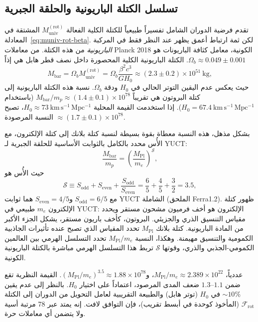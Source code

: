 \documentclass[12pt,a4paper]{article}
\newcommand{\Sodd}{S_{\mathrm{odd}}}
\newcommand{\Seven}{S_{\mathrm{even}}}
\begin{document}
	\subsection{تسلسل الكتلة الباريونية والحلقة الجبرية}
	\label{subsec:baryon-hierarchy}
	
	تقدم فرضية الدوران الشامل تفسيراً طبيعياً للكتلة الكلية الفعالة \(M_{\mathrm{univ}}^{\mathrm{(rot)}}\) المشتقة في المعادلة~\eqref{eq:muniv-rot-beta}. لكن ثمة ارتباط أعمق يظهر عند النظر فقط في المركبة \emph{الباريونية} من هذه الكتلة. من معاملات Planck 2018 الكونية، معامل كثافة الباريونات هو \(\Omega_b \approx 0.049 \pm 0.001\). الكتلة الباريونية الكلية المحصورة داخل نصف قطر هابل هي إذاً
	\begin{equation}
		M_{\mathrm{bar}} = \Omega_b M_{\mathrm{univ}}^{\mathrm{(rot)}} = \Omega_b \frac{\beta^2 c^3}{G H_0} \approx (2.3 \pm 0.2) \times 10^{51}\ \mathrm{kg},
	\end{equation}
	حيث يعكس عدم اليقين التوتر الحالي في \(H_0\) ودقة \(\Omega_b\). نسبة هذه الكتلة الباريونية إلى كتلة البروتون هي تقريباً \(M_{\mathrm{bar}}/m_p \approx (1.4 \pm 0.1) \times 10^{78}\) (باستخدام \(H_0 = 67.4\ \mathrm{km\,s^{-1}\,Mpc^{-1}}\)). إذا استخدمت القيمة المحلية \(H_0 \approx 73\ \mathrm{km\,s^{-1}\,Mpc^{-1}}\)، تصبح النسبة المرصودة \(\approx (1.7 \pm 0.1) \times 10^{78}\).
	
	بشكل مذهل، هذه النسبة معطاة بقوة بسيطة لنسبة كتلة بلانك إلى كتلة الإلكترون، مع الأُس محدد بالكامل بالثوابت الأساسية للحلقة الجبرية لـ YUCT:
	\begin{equation}
		\boxed{ \frac{M_{\mathrm{bar}}}{m_p} = \left( \frac{M_{\mathrm{Pl}}}{m_e} \right)^{\mathcal{S}} },
		\label{eq:baryon-hierarchy}
	\end{equation}
	حيث الأُس هو
	\begin{equation}
		\mathcal{S} \equiv \Sodd + \Seven + \frac{\Sodd}{\Seven} = \frac{6}{5} + \frac{4}{5} + \frac{3}{2} = 3.5,
	\end{equation}
	مع \(\Sodd = 6/5\) و\(\Seven = 4/5\) هما ثوابت YUCT الشاملة (الملحق Ferra1.2). ظهور كتلة الإلكترون \(m_e\) طبيعي في YUCT: الإلكترون هو أخف فرميون مشحون مستقر ويحدد مقياس التنسيق الذري والجزيئي. البروتون، كأخف باريون مستقر، يشكل الجزء الأكبر من المادة الباريونية. كتلة بلانك \(M_{\mathrm{Pl}}\) تحدد المقياس الذي تصبح عنده تأثيرات الجاذبية الكمومية والتنسيق مهيمنة. وهكذا، النسبة \(M_{\mathrm{Pl}}/m_e\) تحدد التسلسل الهرمي بين العالمين الكمومي-الجذبي والذري، وقوتها \(\mathcal{S}\) تربط هذا التسلسل الهرمي مباشرة بالكتلة الباريونية الكونية.
	
	عددياً، \(M_{\mathrm{Pl}}/m_e \approx 2.389 \times 10^{22}\)، و\((M_{\mathrm{Pl}}/m_e)^{3.5} \approx 1.88 \times 10^{78}\). القيمة النظرية تقع ضمن \(1.1\)--\(1.3\) ضعف المدى المرصود، اعتماداً على اختيار \(H_0\). بالنظر إلى عدم يقين \(\sim 10\%\) في \(H_0\) (توتر هابل) والطبيعة التقريبية لعامل التحويل من الدوران إلى الكتلة \(\mathcal{F}_{\mathrm{rot}}\) (المأخوذ كوحدة في أبسط تقريب)، فإن التوافق لافت. إنه يمتد عبر 78 مرتبة أسية ولا يتضمن أي معاملات حرة.
	
\end{document}
